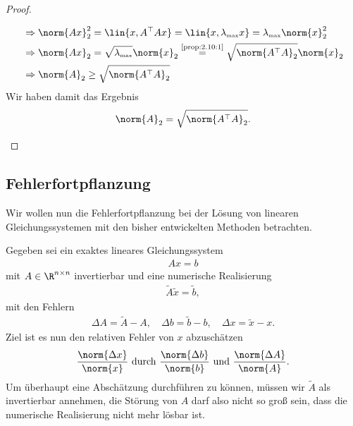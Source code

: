 \begin{proof}
\begin{enumerate}[label=Zu (\roman{*})]
\begin{align*}
&\Rightarrow \norm{Ax}_2^2 = \lin{x,A^\top Ax} = \lin{x,\lambda_\text{\tiny max}
x} = \lambda_\text{\tiny max} \norm{x}_2^2\\
&\Rightarrow \norm{Ax}_2 = \sqrt{\lambda_\text{\tiny max}}\norm{x}_2
\overset{\text{\ref{prop:2.10:1}}}{=} \sqrt{\norm{A^\top A}_2}\norm{x}_2\\
&\Rightarrow \norm{A}_2\ge \sqrt{\norm{A^\top A}_2}
\end{align*}
Wir haben damit das Ergebnis
\begin{align*}
\norm{A}_2 = \sqrt{\norm{A^\top A}_2}.\qedhere
\end{align*}
\end{enumerate}
\end{proof}

\subsection{Fehlerfortpflanzung}
Wir wollen nun die Fehlerfortpflanzung bei der Lösung von
linearen Gleichungssystemen mit den bisher entwickelten Methoden betrachten.

Gegeben sei ein exaktes lineares Gleichungssystem
\begin{align*}
Ax = b \tag{2}
\end{align*}
mit $A\in\R^{n\times n}$ invertierbar und eine numerische Realisierung
\begin{align*}
\tilde{A}\tilde{x} = \tilde{b},
\end{align*}
mit den Fehlern
\begin{align*}
\Delta A = \tilde{A}-A,\quad \Delta b = \tilde{b}- b,\quad \Delta x
=\tilde{x}-x.
\end{align*}
Ziel ist es nun den relativen Fehler von $x$ abzuschätzen 
\begin{align*}
\frac{\norm{\Delta x}}{\norm{x}} \text{ durch } \frac{\norm{\Delta b}}{\norm{b}}
\text{ und } \frac{\norm{\Delta A}}{\norm{A}}.
\end{align*}
Um überhaupt eine Abschätzung durchführen zu können, müssen wir $\tilde{A}$ als
invertierbar annehmen, die Störung von $A$ darf also nicht so groß sein, dass
die numerische Realisierung nicht mehr lösbar ist.

